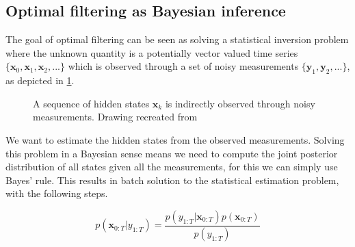 \subsection{Optimal filtering as Bayesian inference}
The goal of optimal filtering can be seen as solving a statistical
inversion problem where
the unknown quantity is a potentially vector valued
time series $\{\mathbf{x}_0, \mathbf{x}_1, \mathbf{x}_2,...\}$ which
is observed through a set of noisy measurements
$\{\mathbf{y}_1, \mathbf{y}_2,...\}$, as depicted in \cref{fig:inversion}.

\begin{figure}[ht!]
    \centering
 \caption{A sequence of  hidden states $\mathbf{x}_k$ is indirectly
 observed through noisy measurements. Drawing recreated from \citet{sarkka2013bayesian}}
    \label{fig:inversion}
\end{figure}


We want to estimate the hidden states from the observed
measurements. Solving this problem in a Bayesian
sense means we 
need to compute the joint posterior distribution of all
states given all the measurements, for this we can simply
use Bayes' rule.
This results in batch solution to the statistical estimation problem,
with the following steps.

$$
p(\mathbf{x}_{0:T} | y_{1:T})
= \frac{p(y_{1:T} | \mathbf{x}_{0:T}) p(\mathbf{x}_{0:T})}
{p(y_{1:T})}
$$

